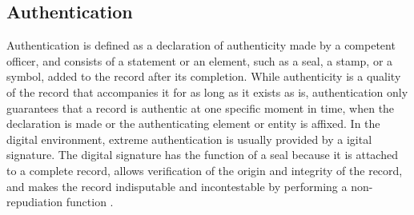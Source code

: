 \subsection{Authentication}
Authentication is defined as a declaration of authenticity made by a competent officer, and consists of a statement or an element, such as a seal, a stamp, or a symbol, added to the record after its completion. While authenticity is a quality of the record that accompanies it for as long as it exists as is, authentication only guarantees that a record is authentic at one specific moment in time, when the declaration is made or the authenticating element or entity is affixed. In the digital environment, extreme authentication is usually provided by a  igital signature. The digital signature has the function of a seal because it is attached to a complete record, allows verification of the origin and integrity of the record, and makes the record indisputable and incontestable by performing a non-repudiation function \cite[53]{duranti2009digital}.

